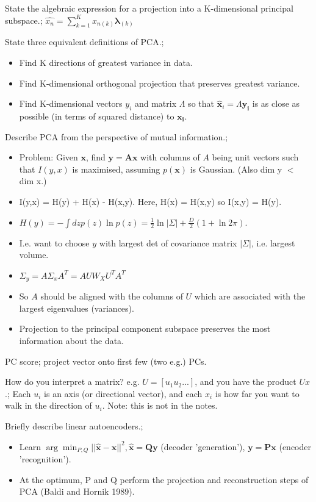 \documentclass{article}
\begin{document}
State the algebraic expression for a projection into a K-dimensional principal subspace.; $\hat{x_n} = \sum_{k=1}^K x_{n(k)}\mathbf{\lambda}_{(k)}$

State three equivalent definitions of PCA.; \begin{itemize} \item Find K directions of greatest variance in data.  \item Find K-dimensional orthogonal projection that preserves greatest variance.  \item Find K-dimensional vectors $y_i$ and matrix $\Lambda$ so that $\hat{\mathbf{x}}_i = \Lambda\mathbf{y_i}$ is as close as possible (in terms of squared distance) to $\mathbf{x_i}$.  \end{itemize}

Describe PCA from the perspective of mutual information.; \begin{itemize} \item Problem: Given $\mathbf{x}$, find $\mathbf{y = Ax}$ with columns of $A$ being unit vectors such that $I(y,x)$ is maximised, assuming $p(\mathbf{x})$ is Gaussian. (Also dim y $<$ dim x.) \item I(y,x) = H(y) + H(x) - H(x,y). Here, H(x) = H(x,y) so I(x,y) = H(y).  \item $H(y)=-\int dz p(z) \ln p(z) = \frac{1}{2}\ln|\Sigma|+\frac{D}{2}(1+\ln 2\pi )$.  \item I.e. want to choose $y$ with largest det of covariance matrix $|\Sigma|$, i.e. largest volume.  \item $\Sigma_y = A\Sigma_x A^T = AUW_XU^TA^T$ \item So $A$ should be aligned with the columns of $U$ which are associated with the largest eigenvalues (variances).  \item Projection to the principal component subspace preserves the most information about the data.  \end{itemize}

PC score; project vector onto first few (two e.g.) PCs.

How do you interpret a matrix? e.g. $U = [u_1 u_2 ...]$, and you have the product $Ux$.; Each $u_i$ is an axis (or directional vector), and each $x_i$ is how far you want to walk in the direction of $u_i$. \newline Note: this is not in the notes.

Briefly describe linear autoencoders.; \begin{itemize} \item Learn $\arg\min_{P,Q}||\hat{\mathbf{x}}-\mathbf{x}||^2, \mathbf{\hat{x}=Qy}$ (decoder 'generation'), $\mathbf{y=Px}$ (encoder 'recognition').  \item At the optimum, P and Q perform the projection and reconstruction steps of PCA (Baldi and Hornik 1989).  \end{itemize}
\end{document}
